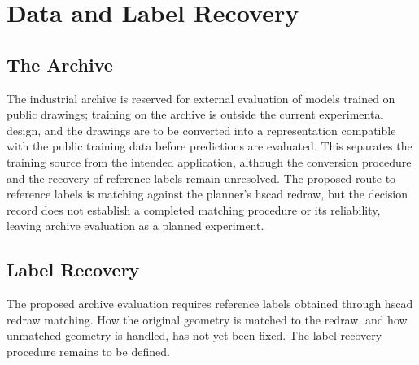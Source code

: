\chapter{Data and Label Recovery}
\label{ch:data}

\section{The Archive}
\label{sec:archive}
The industrial archive is reserved for external evaluation of models trained on
public drawings; training on the archive is outside the current experimental
design, and the drawings
are to be converted into a representation compatible with the public training data
before predictions are evaluated.
This separates the training source from the intended application, although the
conversion procedure and the recovery of reference labels remain unresolved.
The proposed route to reference labels is matching against the planner's
\gls{hscad} redraw, but the decision record does not establish a completed matching
procedure or its reliability, leaving archive evaluation as a planned experiment.


\section{Label Recovery}
\label{sec:label-recovery}
The proposed archive evaluation requires reference labels obtained through
\gls{hscad} redraw matching.
How the original geometry is matched to the redraw, and how unmatched geometry is
handled, has not yet been fixed.
The label-recovery procedure remains to be defined.


